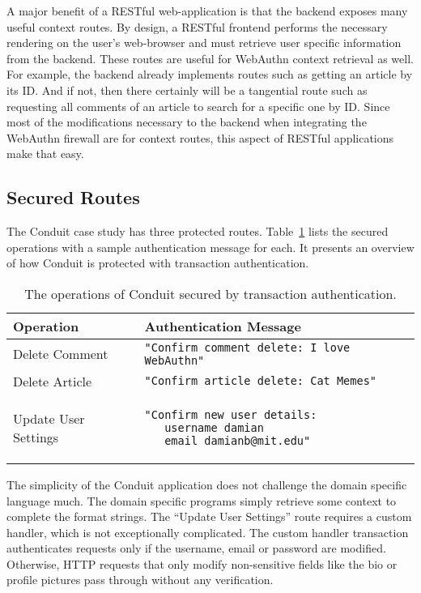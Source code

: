 A major benefit of a RESTful web-application is that the backend exposes many useful context routes. By design, a RESTful frontend performs the necessary rendering on the user's web-browser and must retrieve user specific information from the backend. These routes are useful for WebAuthn context retrieval as well. For example, the backend already implements routes such as getting an article by its ID. And if not, then there certainly will be a tangential route such as requesting all comments of an article to search for a specific one by ID. Since most of the modifications necessary to the backend when integrating the WebAuthn firewall are for context routes, this aspect of RESTful applications make that easy.

\subsection{Secured Routes}

The Conduit case study has three protected routes. Table~\ref{Table:ConduitSecuredRoutes} lists the secured operations with a sample authentication message for each. It presents an overview of how Conduit is protected with transaction authentication.

\begin{table}[h]
\centering

\begin{tabular}{ m{5cm} m{9cm}  } 
 \hline
 Operation & Authentication Message \\ 
 \hline \hline

 Delete Comment & \lstinline|"Confirm comment delete: I love WebAuthn"| \\ \hline

 Delete Article & \lstinline|"Confirm article delete: Cat Memes"| \\ \hline

 Update User Settings & 
 \begin{lstlisting} 
"Confirm new user details:
   username damian
   email damianb@mit.edu"
\end{lstlisting} 
\\ \hline

\end{tabular}
\caption{The operations of Conduit secured by transaction authentication.}
\label{Table:ConduitSecuredRoutes}
\end{table}

The simplicity of the Conduit application does not challenge the domain specific language much. The domain specific programs simply retrieve some context to complete the format strings. The ``Update User Settings'' route requires a custom handler, which is not exceptionally complicated. The custom handler transaction authenticates requests only if the username, email or password are modified. Otherwise, HTTP requests that only modify non-sensitive fields like the bio or profile pictures pass through without any verification.

